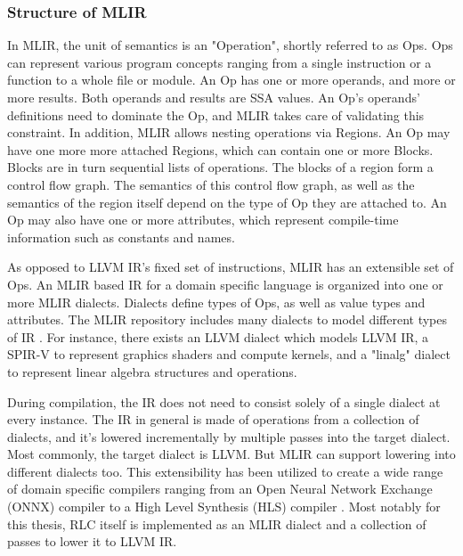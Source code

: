 \subsubsection{Structure of MLIR}
In MLIR, the unit of semantics is an "Operation", shortly referred to as Ops. Ops can represent various program concepts ranging from a single instruction or a function to a whole file or module.
An Op has one or more operands, and more or more results. Both operands and results are SSA values.
An Op's operands' definitions need to dominate the Op, and MLIR takes care of validating this constraint.
In addition, MLIR allows nesting operations via Regions. An Op may have one more more attached Regions, which can contain one or more Blocks.
Blocks are in turn sequential lists of operations.
The blocks of a region form a control flow graph.
The semantics of this control flow graph, as well as the semantics of the region itself depend on the type of Op they are attached to.
An Op may also have one or more attributes, which represent compile-time information such as constants and names.

As opposed to LLVM IR's fixed set of instructions, MLIR has an extensible set of Ops.
An MLIR based IR for a domain specific language is organized into one or more MLIR dialects.
Dialects define types of Ops, as well as value types and attributes.
The MLIR repository includes many dialects to model different types of IR \cite{MLIRDialects}.
For instance, there exists an LLVM dialect which models LLVM IR, a SPIR-V to represent graphics shaders and compute kernels, and a "linalg" dialect to represent linear algebra structures and operations.

During compilation, the IR does not need to consist solely of a single dialect at every instance.
The IR in general is made of operations from a collection of dialects, and it's lowered incrementally by multiple passes into the target dialect.
Most commonly, the target dialect is LLVM. But MLIR can support lowering into different dialects too.
This extensibility has been utilized to create a wide range of domain specific compilers ranging from an Open Neural Network Exchange (ONNX) compiler \cite{onnx-mlir} to a High Level Synthesis (HLS) compiler \cite{ScaleHLS}.
Most notably for this thesis, RLC itself is implemented as an MLIR dialect and a collection of passes to lower it to LLVM IR.

